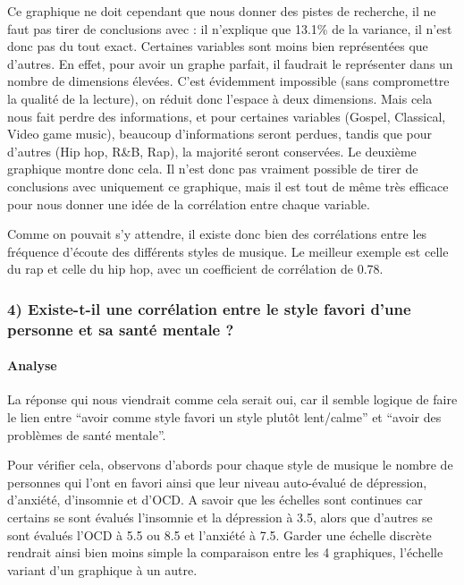\documentclass[
]{article}
\begin{document}
Ce graphique ne doit cependant que nous donner des pistes de recherche,
il ne faut pas tirer de conclusions avec : il n'explique que 13.1\% de
la variance, il n'est donc pas du tout exact. Certaines variables sont
moins bien représentées que d'autres. En effet, pour avoir un graphe
parfait, il faudrait le représenter dans un nombre de dimensions
élevées. C'est évidemment impossible (sans compromettre la qualité de la
lecture), on réduit donc l'espace à deux dimensions. Mais cela nous fait
perdre des informations, et pour certaines variables (Gospel, Classical,
Video game music), beaucoup d'informations seront perdues, tandis que
pour d'autres (Hip hop, R\&B, Rap), la majorité seront conservées. Le
deuxième graphique montre donc cela. Il n'est donc pas vraiment possible
de tirer de conclusions avec uniquement ce graphique, mais il est tout
de même très efficace pour nous donner une idée de la corrélation entre
chaque variable.

Comme on pouvait s'y attendre, il existe donc bien des corrélations
entre les fréquence d'écoute des différents styles de musique. Le
meilleur exemple est celle du rap et celle du hip hop, avec un
coefficient de corrélation de 0.78.

\hypertarget{existe-t-il-une-corruxe9lation-entre-le-style-favori-dune-personne-et-sa-santuxe9-mentale}{%
\subsubsection{4) Existe-t-il une corrélation entre le style favori
d'une personne et sa santé mentale
?}\label{existe-t-il-une-corruxe9lation-entre-le-style-favori-dune-personne-et-sa-santuxe9-mentale}}

\hypertarget{analyse-4}{%
\paragraph{\texorpdfstring{\textbf{Analyse}}{Analyse}}\label{analyse-4}}

La réponse qui nous viendrait comme cela serait oui, car il semble
logique de faire le lien entre ``avoir comme style favori un style
plutôt lent/calme'' et ``avoir des problèmes de santé mentale''.

Pour vérifier cela, observons d'abords pour chaque style de musique le
nombre de personnes qui l'ont en favori ainsi que leur niveau
auto-évalué de dépression, d'anxiété, d'insomnie et d'OCD. A savoir que
les échelles sont continues car certains se sont évalués l'insomnie et
la dépression à 3.5, alors que d'autres se sont évalués l'OCD à 5.5 ou
8.5 et l'anxiété à 7.5. Garder une échelle discrète rendrait ainsi bien
moins simple la comparaison entre les 4 graphiques, l'échelle variant
d'un graphique à un autre.
\end{document}
